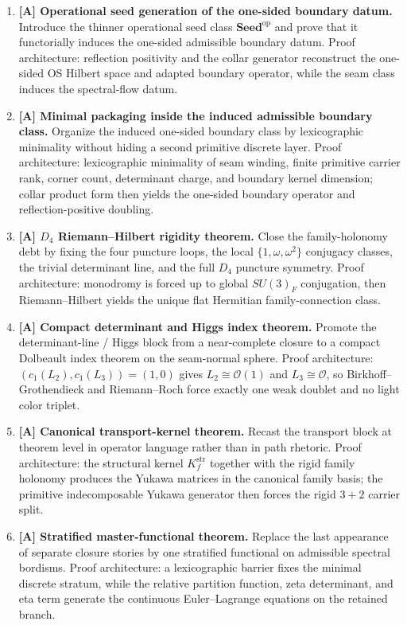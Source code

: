 \documentclass[11pt,a4paper]{article}
\theoremstyle{definition}
\theoremstyle{remark}
\newcommand{\Seedop}{\mathbf{Seed}^{\mathrm{op}}}
\begin{document}
\begin{tcolorbox}[colback=tfptblue!2, colframe=tfptblue!40, breakable,
    title={Version 4.5 completion surface}, colbacktitle=tfptblue!60]
\begin{enumerate}[leftmargin=1.5em, topsep=3pt, itemsep=4pt]
    \item \textbf{[A] Operational seed generation of the one-sided boundary datum.} Introduce the thinner operational seed class $\Seedop$ and prove that it functorially induces the one-sided admissible boundary datum. Proof architecture: reflection positivity and the collar generator reconstruct the one-sided OS Hilbert space and adapted boundary operator, while the seam class induces the spectral-flow datum.
    \item \textbf{[A] Minimal packaging inside the induced admissible boundary class.} Organize the induced one-sided boundary class by lexicographic minimality without hiding a second primitive discrete layer. Proof architecture: lexicographic minimality of seam winding, finite primitive carrier rank, corner count, determinant charge, and boundary kernel dimension; collar product form then yields the one-sided boundary operator and reflection-positive doubling.
    \item \textbf{[A] $D_4$ Riemann--Hilbert rigidity theorem.} Close the family-holonomy debt by fixing the four puncture loops, the local $\{1,\omega,\omega^2\}$ conjugacy classes, the trivial determinant line, and the full $D_4$ puncture symmetry. Proof architecture: monodromy is forced up to global $SU(3)_F$ conjugation, then Riemann--Hilbert yields the unique flat Hermitian family-connection class.
    \item \textbf{[A] Compact determinant and Higgs index theorem.} Promote the determinant-line / Higgs block from a near-complete closure to a compact Dolbeault index theorem on the seam-normal sphere. Proof architecture: $(c_1(L_2),c_1(L_3))=(1,0)$ gives $L_2\cong\mathcal O(1)$ and $L_3\cong\mathcal O$, so Birkhoff--Grothendieck and Riemann--Roch force exactly one weak doublet and no light color triplet.
    \item \textbf{[A] Canonical transport-kernel theorem.} Recast the transport block at theorem level in operator language rather than in path rhetoric. Proof architecture: the structural kernel $K_f^{\mathrm{str}}$ together with the rigid family holonomy produces the Yukawa matrices in the canonical family basis; the primitive indecomposable Yukawa generator then forces the rigid $3+2$ carrier split.
    \item \textbf{[A] Stratified master-functional theorem.} Replace the last appearance of separate closure stories by one stratified functional on admissible spectral bordisms. Proof architecture: a lexicographic barrier fixes the minimal discrete stratum, while the relative partition function, zeta determinant, and eta term generate the continuous Euler--Lagrange equations on the retained branch.

\end{enumerate}
\end{tcolorbox}
\end{document}
